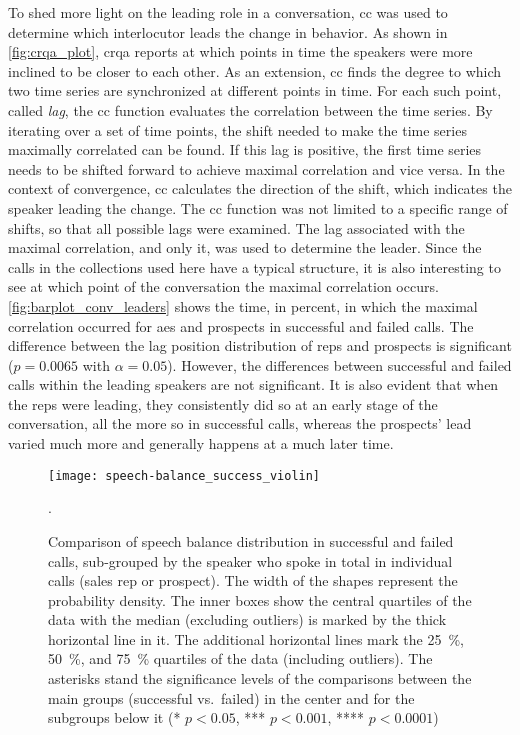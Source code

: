 To shed more light on the leading role in a conversation, \acl{cc} was used to determine which interlocutor leads the change in behavior.
As shown in \cref{fig:crqa_plot}, \ac{crqa} reports at which points in time the speakers were more inclined to be closer to each other.
As an extension, \acl{cc} finds the degree to which two time series are synchronized at different points in time.
For each such point, called \emph{lag}, the \acl{cc} function evaluates the correlation between the time series.
By iterating over a set of time points, the shift needed to make the time series maximally correlated can be found.
If this lag is positive, the first time series needs to be shifted forward to achieve maximal correlation and vice versa.
In the context of convergence, \acl{cc} calculates the direction of the shift, which indicates the speaker leading the change.
The \acl{cc} function was not limited to a specific range of shifts, so that all possible lags were examined.
The lag associated with the maximal correlation, and only it, was used to determine the leader.
Since the calls in the collections used here have a typical structure, it is also interesting to see at which point of the conversation the maximal correlation occurs.
\cref{fig:barplot_conv_leaders} shows the time, in percent, in which the maximal correlation occurred for \acp{ae} and prospects in successful and failed calls.
The difference between the lag position distribution of reps and prospects is significant ($p = 0.0065$ with $\alpha = 0.05$).
However, the differences between successful and failed calls within the leading speakers are not significant.
It is also evident that when the reps were leading, they consistently did so at an early stage of the conversation, all the more so in successful calls, whereas the prospects' lead varied much more and generally happens at a much later time.
%
\begin{figure}[H]
	\centering
	\texttt{[image: speech-balance\_success\_violin]}
	\caption[Distribution of speech balance in successful and failed calls]
		{Comparison of speech balance distribution in successful and failed calls, sub-grouped by the speaker who spoke in total in individual calls (sales rep or prospect).
		The width of the shapes represent the probability density.
		The inner boxes show the central quartiles of the data with the median (excluding outliers) is marked by the thick horizontal line in it.
		The additional horizontal lines mark the \SI{25}{\percent}, \SI{50}{\percent}, and \SI{75}{\percent} quartiles of the data (including outliers).
		The asterisks stand the significance levels of the comparisons between the main groups (successful vs.\ failed) in the center and for the subgroups below it (* $p < 0.05$, *** $p < 0.001$, **** $p < 0.0001$)}.
	\label{fig:speech-balance_success_violin}
\end{figure}
